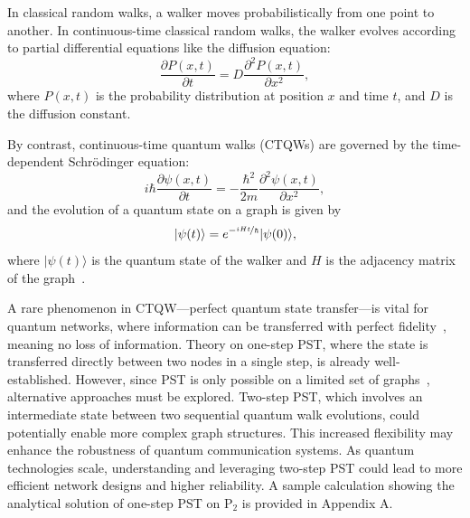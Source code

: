 \documentclass[reprint, aps, 12pt, floatfix]{revtex4-2}
\begin{document}
In classical random walks, a walker moves probabilistically from one point to another. In continuous-time classical random walks, the walker evolves according to partial differential equations like the diffusion equation:
\begin{equation}
    \frac{\partial P(x,t)}{\partial t} = D \frac{\partial^2 P(x,t)}{\partial x^2},
\end{equation}
where $P(x,t)$ is the probability distribution at position $x$ and time $t$, and $D$ is the diffusion constant.

By contrast, continuous-time quantum walks (CTQWs) are governed by the time-dependent Schrödinger equation:
\begin{equation}
    i\hbar\frac{\partial\psi(x,t)}{\partial t}=-\frac{\hbar^2}{2m}\frac{\partial^2\psi(x,t)}{\partial x^2},
\end{equation}
and the evolution of a quantum state on a graph is given by
\begin{equation}
    |\psi(t)\rangle = e^{-\nicefrac{iHt}{\hbar}} |\psi(0)\rangle,
\end{equation}
where $ |\psi(t)\rangle $ is the quantum state of the walker and $H$ is the adjacency matrix of the graph~\cite{FarhiEdward1998Qcad}.

A rare phenomenon in CTQW—perfect quantum state transfer—is vital for quantum networks, where information can be transferred with perfect fidelity~\cite{BoseSougato2003Qcta}, meaning no loss of information. Theory on one-step PST, where the state is transferred directly between two nodes in a single step, is already well-established. However, since PST is only possible on a limited set of graphs~\cite{Kendon:2011:1546-1955:422}, alternative approaches must be explored. Two-step PST, which involves an intermediate state between two sequential quantum walk evolutions, could potentially enable more complex graph structures. This increased flexibility may enhance the robustness of quantum communication systems. As quantum technologies scale, understanding and leveraging two-step PST could lead to more efficient network designs and higher reliability. A sample calculation showing the analytical solution of one-step PST on P$_2$ is provided in Appendix A.
\end{document}
